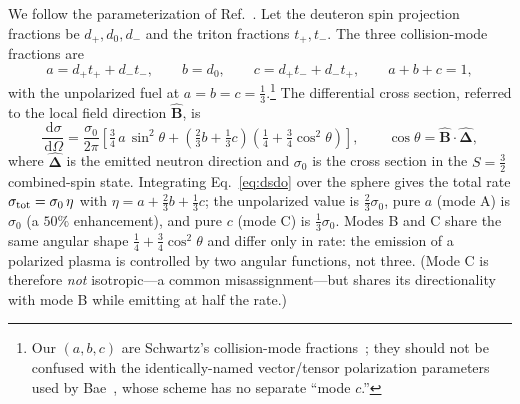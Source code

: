 \documentclass[11pt]{article}
\newcommand{\Bhat}{\hat{\bm{B}}}
\newcommand{\dd}{\,\mathrm{d}}
\begin{document}
We follow the parameterization of Ref.~\cite{schwartz2025}. Let the deuteron spin
projection fractions be $d_+,d_0,d_-$ and the triton fractions $t_+,t_-$. The three
collision-mode fractions are
\begin{equation}
a=d_+t_++d_-t_-,\qquad b=d_0,\qquad c=d_+t_-+d_-t_+,\qquad a+b+c=1,
\label{eq:abc}
\end{equation}
with the unpolarized fuel at $a=b=c=\tfrac13$.\footnote{Our $(a,b,c)$ are Schwartz's
collision-mode fractions~\cite{schwartz2025}; they should not be confused with the
identically-named vector/tensor polarization parameters used by Bae~\cite{bae2025}, whose
scheme has no separate ``mode $c$.''} The differential cross section, referred to
the local field direction $\Bhat$, is
\begin{equation}
\frac{\dd\sigma}{\dd\Omega}=\frac{\sigma_0}{2\pi}\left[\tfrac34\,a\,\sin^2\theta
+\left(\tfrac23 b+\tfrac13 c\right)\left(\tfrac14+\tfrac34\cos^2\theta\right)\right],
\qquad \cos\theta=\Bhat\cdot\hat{\bm\Delta},
\label{eq:dsdo}
\end{equation}
where $\hat{\bm\Delta}$ is the emitted neutron direction and $\sigma_0$ is the cross
section in the $S=\tfrac32$ combined-spin state. Integrating Eq.~\eqref{eq:dsdo} over the
sphere gives the total rate $\sigma_{\rm tot}=\sigma_0\,\eta$ with
$\eta=a+\tfrac23 b+\tfrac13 c$; the unpolarized value is $\tfrac23\sigma_0$, pure $a$
(mode A) is $\sigma_0$ (a $50\%$ enhancement), and pure $c$ (mode C) is $\tfrac13\sigma_0$.
Modes B and C share the same angular shape $\tfrac14+\tfrac34\cos^2\theta$ and differ only
in rate: the emission of a polarized plasma is controlled by two angular functions, not
three. (Mode C is therefore \emph{not} isotropic---a common misassignment---but shares its
directionality with mode B while emitting at half the rate.)
\end{document}
